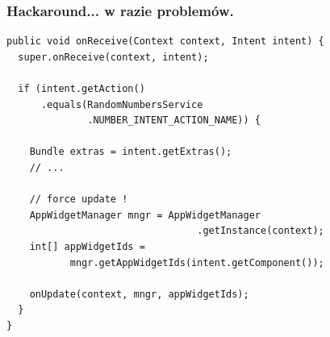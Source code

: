 \documentclass{beamer}
\begin{document}
\begin{frame}[fragile]\frametitle{Hackaround... w razie problemów.}
\begin{lstlisting}
public void onReceive(Context context, Intent intent) {
  super.onReceive(context, intent);

  if (intent.getAction()
      .equals(RandomNumbersService
              .NUMBER_INTENT_ACTION_NAME)) {
    
    Bundle extras = intent.getExtras();
    // ...

    // force update !
    AppWidgetManager mngr = AppWidgetManager
                                 .getInstance(context);
    int[] appWidgetIds = 
           mngr.getAppWidgetIds(intent.getComponent());
    
    onUpdate(context, mngr, appWidgetIds);
  }
}
\end{lstlisting}
\end{frame}
\end{document}
